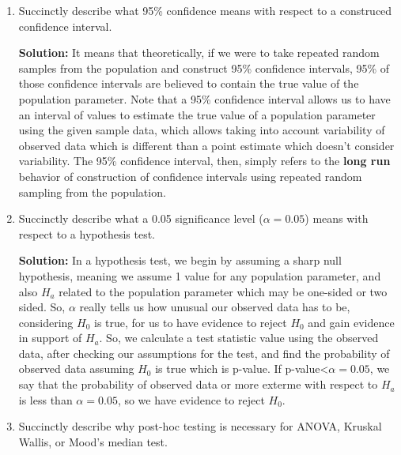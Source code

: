 \documentclass{article}
\begin{document}
\begin{enumerate}
\begin{minipage}[t][1.1in][t]{\textwidth}
    \end{minipage}
  \item Succinctly describe what 95\% confidence
  means with respect to a construced confidence interval.\\
    \begin{minipage}[t][1.1in][t]{\textwidth}
    \textbf{Solution:} It means that theoretically, if we were to take repeated random samples from the population and construct 95\% confidence intervals, 95\% of those confidence intervals are believed to contain the true value of the population parameter. Note that a 95\% confidence interval allows us to have an interval of values to estimate the true value of a population parameter using the given sample data, which allows taking into account variability of observed data which is different than a point estimate which doesn't consider variability. The 95\% confidence interval, then, simply refers to the \textbf{long run} behavior of construction of confidence intervals using repeated random sampling from the population.
    \end{minipage}
  \item Succinctly describe what a 0.05 significance 
  level ($\alpha=0.05$) means with respect to a
  hypothesis test.\\
    \begin{minipage}[t][1.1in][t]{\textwidth}
    \textbf{Solution:} In a hypothesis test, we begin by assuming a sharp null hypothesis, meaning we assume 1 value for any population parameter, and also $H_{a}$ related to the population parameter which may be one-sided or two sided. So, $\alpha$ really tells us how unusual our observed data has to be, considering $H_{0}$ is true, for us to have evidence to reject $H_{0}$ and gain evidence in support of $H_{a}$. So, we calculate a test statistic value using the observed data, after checking our assumptions for the test, and find the probability of observed data assuming $H_{0}$ is true which is p-value. If p-value<$\alpha= 0.05$, we say that the probability of observed data or more exterme with respect to $H_{a}$ is less than $\alpha= 0.05$, so we have evidence to reject $H_{0}$.
    \end{minipage}
  \item Succinctly describe why post-hoc testing is necessary for ANOVA, Kruskal Wallis, or 
  Mood's median test.\\
    \begin{minipage}[t][1.1in][t]{\textwidth}

\end{minipage}
\end{enumerate}
\end{document}
